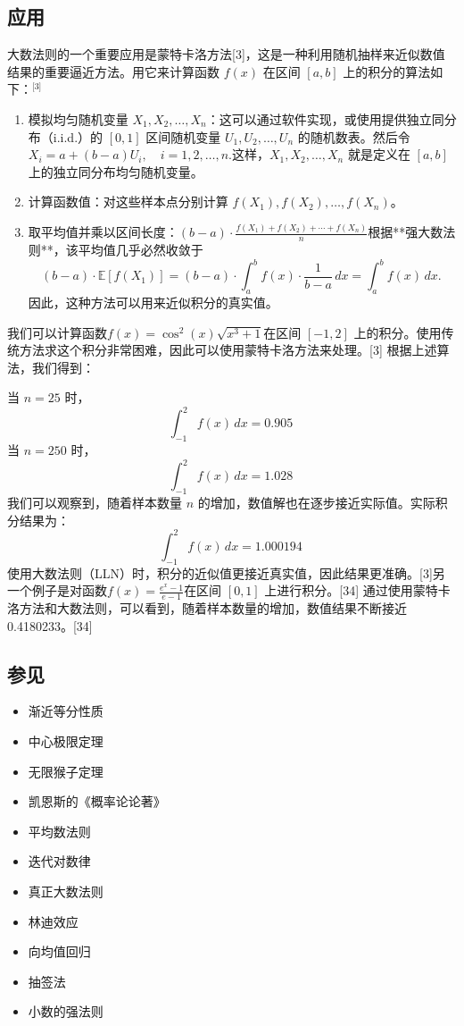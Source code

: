 \subsection{应用}
大数法则的一个重要应用是蒙特卡洛方法[3]，这是一种利用随机抽样来近似数值结果的重要逼近方法。用它来计算函数 $f(x)$ 在区间 $[a, b]$ 上的积分的算法如下：\(^\text{[3]}\)
\begin{enumerate}
\item 模拟均匀随机变量 $X_1, X_2, \ldots, X_n$：这可以通过软件实现，或使用提供独立同分布（i.i.d.）的 $[0, 1]$ 区间随机变量 $U_1, U_2, \ldots, U_n$ 的随机数表。然后令$X_i = a + (b - a) U_i,\quad i = 1, 2, \ldots, n.$这样，$X_1, X_2, \ldots, X_n$ 就是定义在 $[a, b]$ 上的独立同分布均匀随机变量。
\item 计算函数值：对这些样本点分别计算 $f(X_1), f(X_2), \ldots, f(X_n)$。
\item 取平均值并乘以区间长度：$(b - a) \cdot \frac{f(X_1) + f(X_2) + \cdots + f(X_n)}{n}$根据**强大数法则**，该平均值几乎必然收敛于
   $$
   (b - a) \cdot \mathbb{E}[f(X_1)] = (b - a) \cdot \int_a^b f(x) \cdot \frac{1}{b - a} \, dx = \int_a^b f(x)\,dx.~
   $$
因此，这种方法可以用来近似积分的真实值。
\end{enumerate}
我们可以计算函数$f(x) = \cos^2(x)\sqrt{x^3 + 1}$在区间 $[-1, 2]$ 上的积分。使用传统方法求这个积分非常困难，因此可以使用蒙特卡洛方法来处理。[3] 根据上述算法，我们得到：

当 $n = 25$ 时，
  $$
  \int_{-1}^{2} f(x)\,dx = 0.905~
  $$
当 $n = 250$ 时，
  $$
  \int_{-1}^{2} f(x)\,dx = 1.028~
  $$
我们可以观察到，随着样本数量 $n$ 的增加，数值解也在逐步接近实际值。实际积分结果为：
$$
\int_{-1}^{2} f(x)\,dx = 1.000194~
$$
使用大数法则（LLN）时，积分的近似值更接近真实值，因此结果更准确。[3]另一个例子是对函数$f(x) = \frac{e^x - 1}{e - 1}$在区间 $[0, 1]$ 上进行积分。[34] 通过使用蒙特卡洛方法和大数法则，可以看到，随着样本数量的增加，数值结果不断接近 0.4180233。[34]
\subsection{参见}
\begin{itemize}
\item 渐近等分性质
\item 中心极限定理
\item 无限猴子定理
\item 凯恩斯的《概率论论著》
\item 平均数法则
\item 迭代对数律
\item 真正大数法则
\item 林迪效应
\item 向均值回归
\item 抽签法
\item 小数的强法则
\end{itemize}
